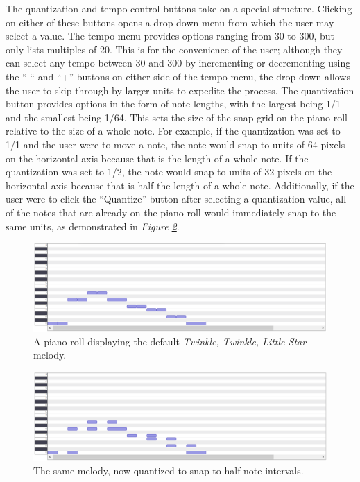 The quantization and tempo control buttons take on a special structure. Clicking on either of
these buttons opens a drop-down menu from which the user may select a value. The tempo menu
provides options ranging from 30 to 300, but only lists multiples of 20. This is for the
convenience of the user; although they can select any tempo between 30 and 300 by incrementing or
decrementing using the “-“ and “+” buttons on either side of the tempo menu, the drop down allows
the user to skip through by larger units to expedite the process. The quantization button provides
options in the form of note lengths, with the largest being 1/1 and the smallest being 1/64. This
sets the size of the snap-grid on the piano roll relative to the size of a whole note. For example,
if the quantization was set to 1/1 and the user were to move a note, the note would snap to units
of 64 pixels on the horizontal axis because that is the length of a whole note. If the quantization
was set to 1/2, the note would snap to units of 32 pixels on the horizontal axis because that is
half the length of a whole note. Additionally, if the user were to click the “Quantize” button
after selecting a quantization value, all of the notes that are already on the piano roll would
immediately snap to the same units, as demonstrated in \textit{Figure \ref{fig:twinkle_quantized}}.

\begin{figure}[h!]
  \centering
  \includegraphics[width=\linewidth]{image/TwinkleOriginal.png}
  \caption{A piano roll displaying the default \textit{Twinkle, Twinkle, Little Star} melody.}
  \label{fig:twinkle_original}
\end{figure}

\begin{figure}[h!]
  \centering
  \includegraphics[width=\linewidth]{image/TwinkleQuantized.png}
  \caption{The same melody, now quantized to snap to half-note intervals.}
  \label{fig:twinkle_quantized}
\end{figure}

